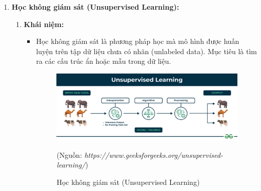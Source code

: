 \documentclass[13pt]{article}
\begin{document}
\begin{enumerate}
    \item \textbf{Học không giám sát (Unsupervised Learning):}
    \begin{enumerate}
        \item \textbf{Khái niệm:}
        \begin{itemize}
            \item Học không giám sát là phương pháp học mà mô hình được huấn luyện trên tập dữ liệu chưa có nhãn (unlabeled data). Mục tiêu là tìm ra các cấu trúc ẩn hoặc mẫu trong dữ liệu.

    \begin{figure}[h!]
        \centering        \includegraphics[width=0.7\linewidth]{image/h6.png}
            \caption{Học không giám sát (Unsupervised Learning)}
            \label{fig:label1}
            (Nguồn: \textit{https://www.geeksforgeeks.org/unsupervised-learning/})
    \end{figure}
    
        \end{itemize}
        

\end{enumerate}
\end{enumerate}
\end{document}
